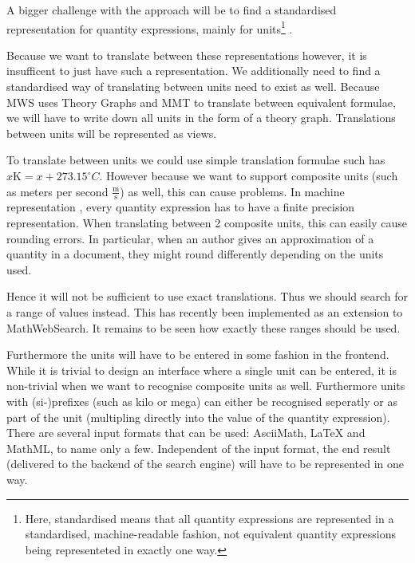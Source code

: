 \documentclass[11pt]{article}
\begin{document}
A bigger challenge with the approach will be to find a standardised representation for quantity expressions, mainly for units\footnote{Here, standardised means that all quantity expressions are represented in a standardised, machine-readable fashion, not equivalent quantity expressions being representeted in exactly one way. } .

Because we want to translate between these representations however, it is insufficent to just have such a representation. We additionally need to find a standardised way of translating between units need to exist as well. Because MWS uses Theory Graphs and MMT to translate between equivalent formulae, we will have to write down all units in the form of a theory graph. Translations between units will be represented as views.

To translate between units we could use simple translation formulae such has $x \text{K} = x + 273.15 ^\circ{C} $. However because we want to support composite units (such as meters per second $\frac{\text{m}}{\text{s}}$) as well, this can cause problems. In machine representation , every quantity expression has to have a finite precision representation. When translating between 2 composite units, this can easily cause rounding errors. In particular, when an author gives an approximation of a quantity in a document, they might round differently depending on the units used.

Hence it will not be sufficient to use exact translations. Thus we should search for a range of values instead. This has recently been implemented as an extension to MathWebSearch\cite{MWS:Ranges}. It remains to be seen how exactly these ranges should be used.

Furthermore the units will have to be entered in some fashion  in the frontend. While it is trivial to design an interface where a single unit can be entered, it is non-trivial when we want to recognise composite units as well. Furthermore units with (si-)prefixes (such as kilo or mega) can either be recognised seperatly or as part of the unit (multipling directly into the value of the quantity expression). There are several input formats that can be used: AsciiMath, \LaTeX{} and MathML, to name only a few. Independent of the input format, the end result (delivered to the backend of the search engine) will have to be represented in one way.

{}
\end{document}
